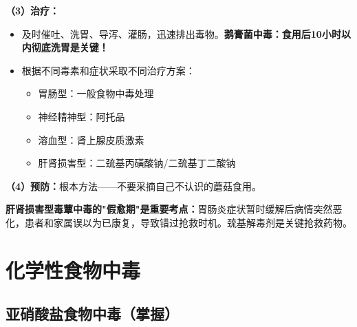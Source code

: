 \begin{keybox}
\textbf{（3）治疗：}
\begin{itemize}[leftmargin=*]
    \item 及时催吐、洗胃、导泻、灌肠，迅速排出毒物。\textbf{鹅膏菌中毒：食用后10小时以内彻底洗胃是关键！}
    \item 根据不同毒素和症状采取不同治疗方案：
    \begin{itemize}
        \item 胃肠型：一般食物中毒处理
        \item 神经精神型：阿托品
        \item 溶血型：肾上腺皮质激素
        \item 肝肾损害型：二巯基丙磺酸钠/二巯基丁二酸钠
    \end{itemize}
\end{itemize}

\textbf{（4）预防：}根本方法——不要采摘自己不认识的蘑菇食用。
\end{keybox}

\begin{exambox}
\textbf{肝肾损害型毒蕈中毒的"假愈期"是重要考点：}胃肠炎症状暂时缓解后病情突然恶化，患者和家属误以为已康复，导致错过抢救时机。巯基解毒剂是关键抢救药物。
\end{exambox}

\section{化学性食物中毒}

\subsection{亚硝酸盐食物中毒（掌握）}

